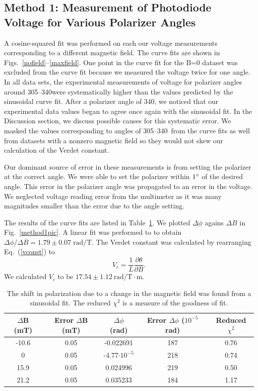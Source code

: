 \documentclass[prb,preprint]{revtex4-1}
\begin{document}
{\subsection{Method 1: Measurement of Photodiode Voltage for Various Polarizer Angles}
{A cosine-squared fit was performed on each our voltage measurements corresponding to a different magnetic field. The curve fits are shown in Figs.~\ref{nofield}--\ref{maxfield}.  One point in the curve fit for the B=0 dataset was excluded from the curve fit because we measured the voltage twice for one angle. In all data sets, the experimental measurements of voltage for polarizer angles around 305\degree--340\degree were systematically higher than the values predicted by the sinusoidal curve fit. After a polarizer angle of 340\degree, we noticed that our experimental data values began to agree once again with the sinusoidal fit.  In the Discussion section, we discuss possible causes for this systematic error. We masked the values corresponding to angles of 305\degree--340\degree\  from the curve fits as well from datasets with a nonzero magnetic field so they would not skew our calculation of the Verdet constant.

Our dominant source of error in these measurements is from setting the polarizer at the correct angle. We were able to set the polarizer within $1\degree$ of the desired angle. This error in the polarizer angle was propagated to an error in the voltage. We neglected voltage reading error from the multimeter as it was many magnitudes smaller than the error due to the angle setting.

The results of the curve fits are listed in Table~\ref{shift table}. We plotted $\Delta \phi$ agains $\Delta B$ in Fig.~\ref{method1pic}. A linear fit was performed to to obtain $\Delta \phi/\Delta B=1.79 \pm 0.07\textrm{~rad/T}$. The Verdet constant was calculated by rearranging Eq.~(\ref{vconst}) to
\begin{equation}
V_{c} =\frac{1}{L} \frac{\partial \theta}{\partial B}. 
\end{equation}
We calculated $V_c$ to be $17.54 \pm 1.12 \mathrm{~rad/T} \cdot \textrm{m}$.
\begin{table}
    \begin{ruledtabular}
        \begin{tabular}{ccccc}
            $\Delta$B (mT)&Error $\Delta$B (mT)&$\Delta \phi$ (rad)&Error $\Delta\phi$ ($10^{-5}$ rad)&Reduced $\chi^2$ \\  \hline
            -10.6 & 0.05 & -0.022691 & 187 & 0.76 \\
            0     & 0.05 & -4.77$\cdot10^{-5}$ & 218 & 0.74 \\
            15.9  & 0.05 & 0.024996  & 219 & 0.50 \\
            21.2  & 0.05 & 0.035233  & 184 & 1.17
        \end{tabular}
    \end{ruledtabular}
\caption{\label{shift table}The shift in polarization due to a change in the magnetic field was found from a sinusoidal fit. The reduced $\chi^2$ is a measure of the goodness of fit.}
\end{table}
}


}
\end{document}
